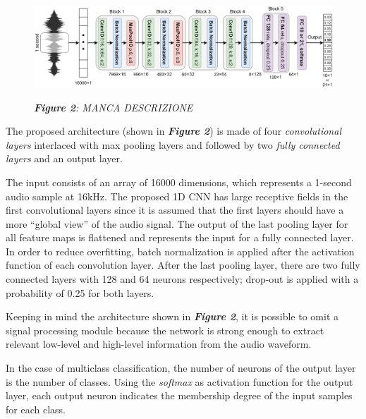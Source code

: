 \documentclass[conference]{IEEEtran}
\begin{document}
\begin{figure}
\centering
\includegraphics[scale=0.16]{1DCNN}

\begin{small}\textit{\textbf{Figure 2}: MANCA DESCRIZIONE}
\end{small}
\end{figure}

The proposed architecture (shown in \textbf{\textit{Figure 2}}) is made of four \textit{convolutional layers} interlaced with max pooling layers and followed by two \textit{fully connected layers} and an output layer.

The input consists of an array of 16000 dimensions, which represents a 1-second audio sample at 16kHz.
The proposed 1D CNN has large receptive fields in the first convolutional layers since it is assumed that the first layers should have a more “global view” of the audio signal. The output of the last pooling layer for all feature maps is flattened and represents the input for a fully connected layer. In order to reduce overfitting, batch normalization is applied after the activation function of each convolution layer. After the last pooling layer, there are two fully connected layers with 128 and 64 neurons respectively; drop-out is applied with a probability of 0.25 for both layers.

Keeping in mind the architecture shown in \textbf{\textit{Figure 2}}, it is possible to omit a signal processing module because the network is strong enough to extract relevant low-level and high-level information from the audio waveform.

In the case of multiclass classification, the number of neurons of the output layer is the number of classes. Using the \textit{softmax} as activation function for the output layer, each output neuron indicates the membership degree of the input samples for each class.


\end{document}
